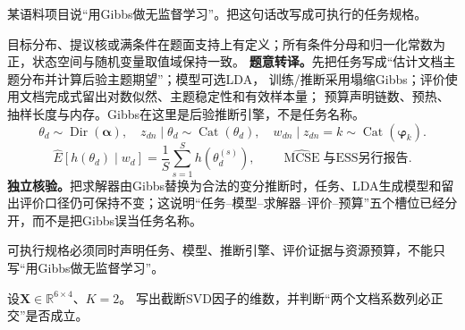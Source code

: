 \label{struct:V5-C08-CH32}
\begin{example}[对象、目标与求解器分层]\label{exm:V5-C08-layering}
某语料项目说“用Gibbs做无监督学习”。把这句话改写成可执行的任务规格。
\end{example}
\begin{solution}
\SolGiven 目标分布、提议核或满条件在题面支持上有定义；所有条件分母和归一化常数为正，状态空间与随机变量取值域保持一致。
\SolDerive
\textbf{题意转译。}先把任务写成“估计文档主题分布并计算后验主题期望”；模型可选LDA，
训练/推断采用塌缩Gibbs；评价使用文档完成式留出对数似然、主题稳定性和有效样本量；
预算声明链数、预热、抽样长度与内存。Gibbs在这里是后验推断引擎，不是任务名称。
\[
\theta_d\sim\operatorname{Dir}(\boldsymbol\alpha),\quad
z_{dn}\mid\theta_d\sim\operatorname{Cat}(\theta_d),\quad
w_{dn}\mid z_{dn}=k\sim\operatorname{Cat}(\boldsymbol\varphi_k).
\]
\[
\widehat E[h(\theta_d)\mid w_d]
=\frac1S\sum_{s=1}^Sh(\theta_d^{(s)}),\qquad
\widehat{\operatorname{MCSE}}\text{与ESS另行报告}.
\]
\textbf{独立核验。}把求解器由Gibbs替换为合法的变分推断时，任务、LDA生成模型和留出评价口径仍可保持不变；这说明“任务--模型--求解器--评价--预算”五个槽位已经分开，而不是把Gibbs误当任务名称。

\SolAnswer 可执行规格必须同时声明任务、模型、推断引擎、评价证据与资源预算，不能只写“用Gibbs做无监督学习”。
\end{solution}
\begin{example}[LSA因子维数纠错]\label{exm:V5-C08-lsa-shape}
设$\boldsymbol X\in\mathbb R^{6\times4}$、$K=2$。
写出截断SVD因子的维数，并判断“两个文档系数列必正交”是否成立。
\end{example}
